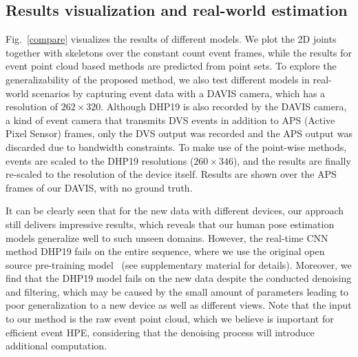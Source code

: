 \documentclass[10pt,twocolumn,letterpaper]{article}
\begin{document}
\subsection{Results visualization and real-world estimation}
Fig.~\ref{compare} visualizes the results of different models. We plot the 2D joints together with skeletons over the constant count event frames, while the results for event point cloud based methods are predicted from point sets.
To explore the generalizability of the proposed method,
we also test different models in real-world scenarios by capturing event data with a DAVIS camera, which has a resolution of $262{\times}320$. Although DHP19 is also recorded by the DAVIS camera, a kind of event camera that transmits DVS events in addition to APS (Active Pixel Sensor) frames, only the DVS output was recorded and the APS output was discarded due to bandwidth constraints.
To make use of the point-wise methods, events are scaled to the DHP19 resolutions ({$260{\times}346$}), and the results are finally re-scaled to the resolution of the device itself.
Results are shown over the APS frames of our DAVIS, with no ground truth.

It can be clearly seen that for the new data with different devices, 
our approach still delivers impressive results,
which reveals that our human pose estimation models generalize well to such unseen domains. However, the real-time CNN method DHP19 fails on the entire sequence, where we use the original open source pre-training model~\cite{calabrese2019dhp19} (see supplementary material for details).
Moreover, we find that the DHP19 model fails on the new data despite the conducted denoising and filtering, which may be caused by the small amount of parameters leading to poor generalization to a new device as well as different views. Note that the input to our method is the raw event point cloud, which we believe is important for efficient event HPE, considering that the denoising process will introduce additional computation.

\end{document}
